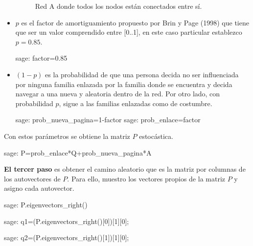 \begin{itemize}
    \begin{figure}[H]
        \centering
        \label{redA_2}
        \caption{Red A donde todos los nodos están conectados entre sí.}
    \end{figure}
    \item $p$ es el factor de amortiguamiento propuesto por Brin y Page (1998) que tiene que ser un valor 
    comprendido entre [0..1], en este caso particular establezco $p=0.85$.
    \begin{sagecommandline}
        sage: factor=0.85
    \end{sagecommandline}
    \item  $(1-p)$ es la probabilidad de que una persona decida no ser influenciada por ninguna familia enlazada por la familia donde se encuentra y 
    decida navegar a una nueva y aleatoria dentro de la red. Por otro lado, con probabilidad $p$, sigue a las familias enlazadas 
    como de costumbre.
    \begin{sagecommandline}
        sage: prob_nueva_pagina=1-factor
        sage: prob_enlace=factor
    \end{sagecommandline}
\end{itemize}

\par Con estos parámetros se obtiene la matriz $P$ estocástica.
\begin{sagecommandline}
    sage: P=prob_enlace*Q+prob_nueva_pagina*A
\end{sagecommandline}

\par \textbf{El tercer paso} es obtener el camino aleatorio que es la matriz por columnas de los autovectores de $P$.
Para ello, muestro los vectores propios de la matriz $P$ y asigno cada autovector.
\begin{sagecommandline}[\textwidth]
    sage: P.eigenvectors_right()
\end{sagecommandline}
    
\begin{sagecommandline}
    sage: q1=(P.eigenvectors_right()[0])[1][0];
\end{sagecommandline}

\begin{sagecommandline}
    sage: q2=(P.eigenvectors_right()[1])[1][0];
\end{sagecommandline}

